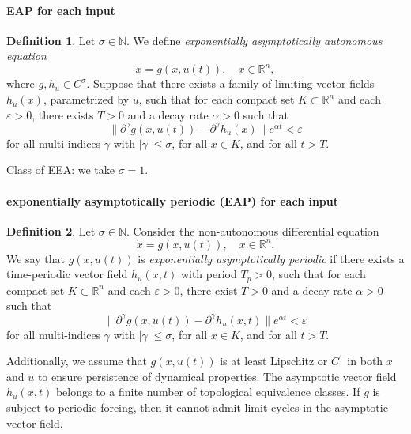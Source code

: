 \documentclass{article}
\theoremstyle{definition} \newtheorem{definition}{Definition}
\theoremstyle{remark} \newtheorem{remark}{Remark}
\newcounter{ct}
\begin{document}
\paragraph{EAP for each input}\label{sec:eea_input}
\begin{definition}\label{def:eaa_input}
Let \(\sigma \in \mathbb{N}\).
We define \emph{exponentially asymptotically autonomous equation  }
\[
\dot{x} = g(x,u(t)), \quad x \in \mathbb{R}^n,
\]
where \( g, h_u \in C^\sigma \). Suppose that there exists a family of limiting vector fields \( h_u(x) \), parametrized by \( u \), such that for each compact set \( K \subset \mathbb{R}^n \) and each \( \varepsilon > 0 \), there exists \( T > 0 \) and a decay rate \( \alpha > 0 \) such that  
\[
\|\partial^\gamma g(x, u(t)) - \partial^\gamma h_u(x)\| e^{\alpha t} < \varepsilon
\]
for all multi-indices \( \gamma \) with \( |\gamma| \leq \sigma \), for all \( x \in K \), and for all \( t > T \).
\end{definition}

Class of EEA: 
we take $\sigma =  1$.

\paragraph{exponentially asymptotically periodic (EAP) for each input}\label{sec:eea_input_periodic}
\begin{definition}\label{def:eaa_periodic}
Let \(\sigma \in \mathbb{N}\).
 Consider the non-autonomous differential equation  
\[
\dot{x} = g(x,u(t)), \quad x \in \mathbb{R}^n.
\]
We say that \( g(x, u(t)) \) is \emph{exponentially asymptotically periodic} if there exists a time-periodic vector field \( h_u(x,t) \) with period \( T_p > 0 \), such that for each compact set \( K \subset \mathbb{R}^n \) and each \( \varepsilon > 0 \), there exist \( T > 0 \) and a decay rate \( \alpha > 0 \) such that  
\[
\|\partial^\gamma g(x, u(t)) - \partial^\gamma h_u(x,t)\| e^{\alpha t} < \varepsilon
\]
for all multi-indices \( \gamma \) with \( |\gamma| \leq \sigma \), for all \( x \in K \), and for all \( t > T \).

Additionally, we assume that \( g(x, u(t)) \) is at least Lipschitz or \( C^1 \) in both \( x \) and \( u \) to ensure persistence of dynamical properties. The asymptotic vector field \( h_u(x,t) \) belongs to a finite number of topological equivalence classes. If \( g \) is subject to periodic forcing, then it cannot admit limit cycles in the asymptotic vector field.
\end{definition}
\end{document}
